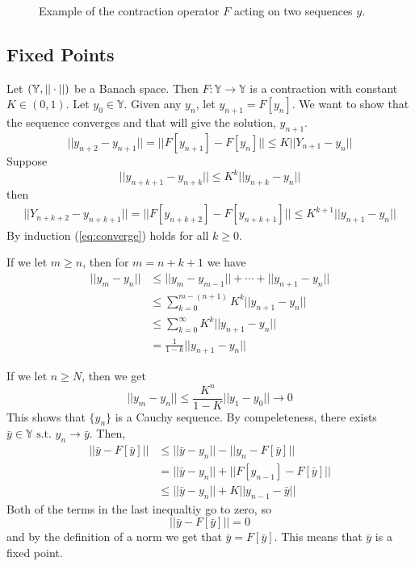 \documentclass[lecture,12pt,]{pcms-l}
\begin{document}
\begin{figure}[ht!]
	\centering
	 \hfill
	\caption{Example of the contraction operator $F$ acting on two sequences $y$.}
	\label{fig:07contraction}
\end{figure}

\subsection{Fixed Points}
Let $(\mathbb{Y},||\cdot||)$ be a Banach space. Then $F:\mathbb{Y}\to\mathbb{Y}$ is a contraction with constant $K\in(0,1)$. Let $y_0\in\mathbb{Y}$. Given any $y_n$, let $y_{n+1}=F[y_n]$. We want to show that the sequence converges and that will give the solution, $y_{n+1}$.
$$||y_{n+2}-y_{n+1}|| = ||F[y_{n+1}]-F[y_n]|| \leq K||Y_{n+1}-y_n||$$
Suppose
$$||y_{n+k+1}-y_{n+k}||\leq K^k||y_{n+k}-y_n||$$
then
\begin{align}
\label{eq:converge}
||Y_{n+k+2}-y_{n+k+1}|| = ||F[y_{n+k+2}]-F[y_{n+k+1}]|| \leq K^{k+1}||y_{n+1}-y_n||
\end{align}
By induction (\ref{eq:converge}) holds for all $k\geq0$.

If we let $m\geq n$, then for $m=n+k+1$ we have
\begin{align*}
||y_m-y_n|| &\leq ||y_m-y_{m-1}|| + \cdots + ||y_{n+1}-y_n|| \\
&\leq \sum_{k=0}^{m-(n+1)} K^k||y_{n+1}-y_n|| \\
&\leq \sum_{k=0}^\infty K^k||y_{n+1}-y_n|| \\
&= \frac{1}{1-k}||y_{n+1}-y_n||
\end{align*}

If we let $n\geq N$, then we get
$$||y_m-y_n|| \leq \frac{K^n}{1-K}||y_1-y_0||\to0$$
This shows that $\{y_n\}$ is a Cauchy sequence. By compeleteness, there exists $\bar{y}\in\mathbb{Y}\text{ s.t. } y_n\to\bar{y}$. Then,
\begin{align*}
||\bar{y}-F[\bar{y}]|| &\leq ||\bar{y}-y_n|| - ||y_n-F[\bar{y}]|| \\
&= ||\bar{y}-y_n|| + ||F[y_{n-1}]-F[\bar{y}]|| \\
&\leq ||\bar{y}-y_n|| + K||y_{n-1}-\bar{y}||
\end{align*}
Both of the terms in the last inequaltiy go to zero, so
$$||\bar{y}-F[\bar{y}]|| = 0$$
and by the definition of a norm we get that $\bar{y}=F[\bar{y}]$. This means that $\bar{y}$ is a fixed point.
\end{document}
